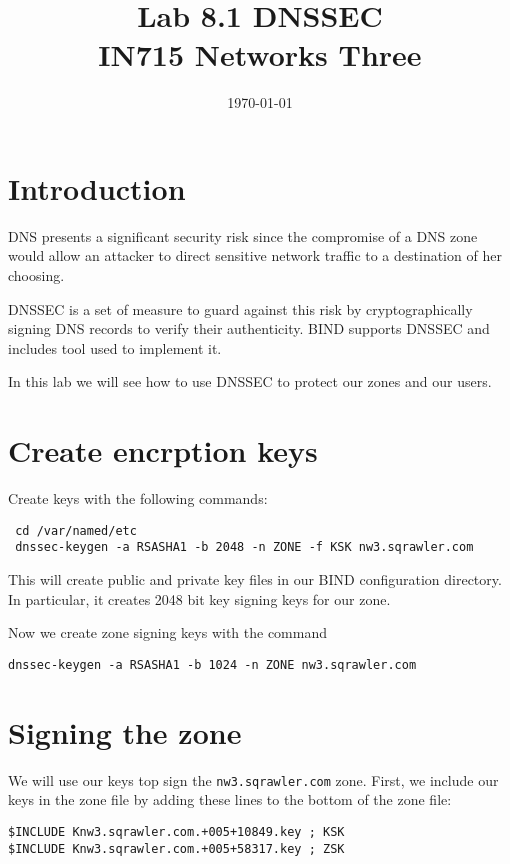 \documentclass{article}
\begin{document}
\title{ Lab 8.1 DNSSEC\\ IN715 Networks Three}
\date{\today}
\maketitle

\section*{Introduction}
DNS presents a significant security risk since the compromise of a DNS
zone would allow an attacker to direct sensitive network traffic to a
destination of her choosing.  

DNSSEC is a set of measure to guard against this risk by cryptographically 
signing DNS records to verify their authenticity.  BIND supports DNSSEC and includes tool used to implement it.

In this lab we will see how to use DNSSEC to protect our zones and our users.

\section{Create encrption keys}
Create keys with the following commands:

\begin{verbatim}
 cd /var/named/etc
 dnssec-keygen -a RSASHA1 -b 2048 -n ZONE -f KSK nw3.sqrawler.com
\end{verbatim}

This will create public and private key files in our BIND configuration directory.  In particular, it creates 2048 bit key signing keys for our zone.

Now we create zone signing keys with the command

\begin{verbatim}
dnssec-keygen -a RSASHA1 -b 1024 -n ZONE nw3.sqrawler.com
\end{verbatim}

\section{Signing the zone}
We will use our keys top sign the \texttt{nw3.sqrawler.com} zone.  First, we include our keys in the zone file by adding these lines to the bottom of the zone file:

\begin{verbatim}
$INCLUDE Knw3.sqrawler.com.+005+10849.key ; KSK
$INCLUDE Knw3.sqrawler.com.+005+58317.key ; ZSK
\end{verbatim}
\end{document}
